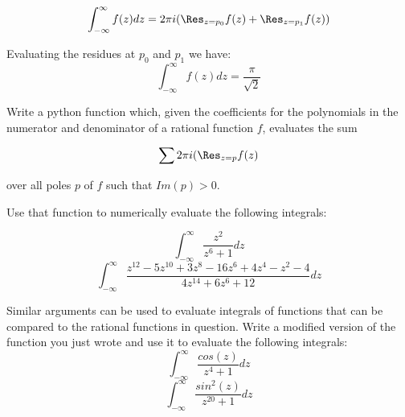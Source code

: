 \begin{equation*}
 \int_{-\infty}^{\infty} f(z) dz = 2\pi i (\Res_{z=p_0} f(z) +\Res_{z=p_1} f(z))
\end{equation*}

Evaluating the residues at $p_0$ and $p_1$ we have:
$$\int_{-\infty}^{\infty} f(z) dz = \frac{\pi}{\sqrt{2}}$$

\begin{problem}
Write a python function which, given the coefficients for the polynomials in the numerator and denominator of a rational function $f$, evaluates the sum

\begin{equation*}
\sum 2\pi i (\Res_{z=p} f(z)
\end{equation*}

over all poles $p$ of $f$ such that $Im(p)>0$.

Use that function to numerically evaluate the following integrals:

$$\int_{-\infty}^{\infty} \frac{z^2}{z^6+1}dz$$
$$\int_{-\infty}^{\infty} \frac{z^{12}-5z^{10}+3z^8-16z^6+4z^4-z^2-4}{4z^14+6z^6+12}dz$$

\end{problem}

\begin{problem}
Similar arguments can be used to evaluate integrals of functions that can be compared to the rational functions in question. Write a modified version of the function you just wrote and use it to evaluate the following integrals:
$$\int_{-\infty}^{\infty}\frac{cos(z)}{z^4+1}dz$$
$$\int_{-\infty}^{\infty}\frac{sin^2(z)}{z^{20}+1}dz$$
\end{problem}

